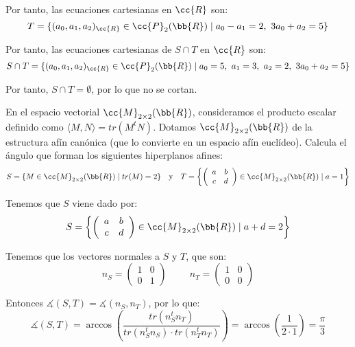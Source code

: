 \begin{ejercicio}
    Por tanto, las ecuaciones cartesianas en $\cc{R}$ son:
    \begin{equation*}
        T = \{(a_0,a_1,a_2)_{\cc{R}}\in \cc{P}_2(\bb{R})\mid a_0-a_1=2,~3a_0+a_2=5\}
    \end{equation*}

    Por tanto, las ecuaciones cartesianas de $S\cap T$ en $\cc{R}$ son:
    \begin{equation*}
        S\cap T = \{(a_0,a_1,a_2)_{\cc{R}}\in \cc{P}_2(\bb{R})\mid a_0 = 5,~a_1=3,~a_2=2,~3a_0+a_2=5\}
    \end{equation*}

    Por tanto, $S\cap T = \emptyset$, por lo que no se cortan.
\end{ejercicio}

\begin{ejercicio}
    En el espacio vectorial $\cc{M}_{2\times 2}(\bb{R})$, consideramos el producto escalar definido como $\langle M, N\rangle = tr(M^tN)$. Dotamos $\cc{M}_{2\times 2}(\bb{R})$ de la estructura afín canónica (que lo convierte en un espacio afín euclídeo). Calcula el ángulo que forman los siguientes hiperplanos afines:
    \begin{equation*}
        S = \{M \in \cc{M}_{2\times 2}(\bb{R}) \mid tr(M) = 2\}
        \quad \text{y}\quad 
        T = \left\{\left(\begin{array}{cc}
            a & b \\ c & d
        \end{array}\right) \in \cc{M}_{2\times 2}(\bb{R}) \mid a = 1 \right\}
    \end{equation*}


    Tenemos que $S$ viene dado por:
    \begin{equation*}
        S = \left\{\left(\begin{array}{cc}
            a & b \\ c & d
        \end{array}\right) \in \cc{M}_{2\times 2}(\bb{R}) \mid a + d = 2 \right\}
    \end{equation*}

    Tenemos que los vectores normales a $S$ y $T$, que son:
    \begin{equation*}
        n_S=\left(\begin{array}{cc}
            1 & 0 \\ 0 & 1
        \end{array}\right)
        \hspace{1cm}
        n_T=\left(\begin{array}{cc}
            1 & 0 \\ 0 & 0
        \end{array}\right)
    \end{equation*}

    Entonces $\measuredangle(S,T) = \measuredangle (n_S, n_T)$, por lo que:
    \begin{equation*}
        \measuredangle(S,T) = \arccos \left(\frac{tr(n_S^tn_T)}{tr(n_S^tn_S) \cdot tr(n_T^tn_T)}\right)
        = \arccos \left(\frac{1}{2 \cdot 1}\right) = \frac{\pi}{3}
    \end{equation*}
\end{ejercicio}


